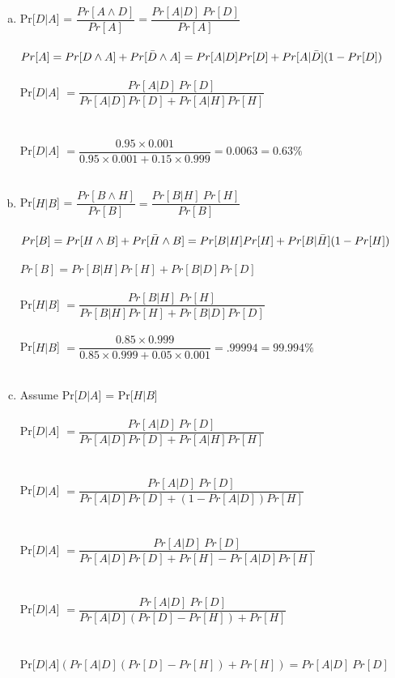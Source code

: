 \documentclass[11pt,letterpaper]{article}
\begin{document}
\begin{enumerate}[(a)]
\item
Pr[$D|A$] = $\dfrac{Pr[A\wedge D]}{Pr[A]} =\dfrac{Pr[A|D]~Pr[D]}{Pr[A]}$\\\\
$Pr[A] = Pr[D\wedge A] + Pr[\Bar{D}\wedge A] = Pr[A|D]Pr[D] + Pr[A|\bar{D}](1-Pr[D])$\\\\
Pr[$D|A$] $=\dfrac{Pr[A|D]~Pr[D]}{Pr[A|D]Pr[D] + Pr[A|H]Pr[H]}$\\\\\\
Pr[$D|A$] $=\dfrac{0.95\times0.001}{0.95\times0.001 + 0.15\times0.999} = 0.0063 = 0.63\%$\\\\
\item
Pr[$H|B$] = $\dfrac{Pr[B\wedge H]}{Pr[B]} =\dfrac{Pr[B|H]~Pr[H]}{Pr[B]}$\\\\
$Pr[B] = Pr[H\wedge B] + Pr[\Bar{H}\wedge B] = Pr[B|H]Pr[H] + Pr[B|\bar{H}](1-Pr[H])$\\\\
$Pr[B] = Pr[B|H]Pr[H] + Pr[B|D]Pr[D]$\\\\
Pr[$H|B$] $=\dfrac{Pr[B|H]~Pr[H]}{Pr[B|H]Pr[H] + Pr[B|D]Pr[D]}$\\\\
Pr[$H|B$] $=\dfrac{0.85\times0.999}{0.85\times0.999 + 0.05\times0.001} = .99994 = 99.994 \%$\\\\
\item
Assume Pr[$D|A$] = Pr[$H|B$]\\\\
Pr[$D|A$] $=\dfrac{Pr[A|D]~Pr[D]}{Pr[A|D]Pr[D] + Pr[A|H]Pr[H]}$\\\\\\
Pr[$D|A$] $=\dfrac{Pr[A|D]~Pr[D]}{Pr[A|D]Pr[D] + (1- Pr[A|D])Pr[H]}$\\\\\\
Pr[$D|A$] $=\dfrac{Pr[A|D]~Pr[D]}{Pr[A|D]Pr[D] + Pr[H] - Pr[A|D]Pr[H]}$\\\\\\
Pr[$D|A$] $=\dfrac{Pr[A|D]~Pr[D]}{Pr[A|D](Pr[D] - Pr[H]) + Pr[H]}$\\\\\\
Pr[$D|A$]$(Pr[A|D](Pr[D] - Pr[H]) + Pr[H]) = Pr[A|D]~Pr[D]$\\\\\\

\end{enumerate}
\end{document}
